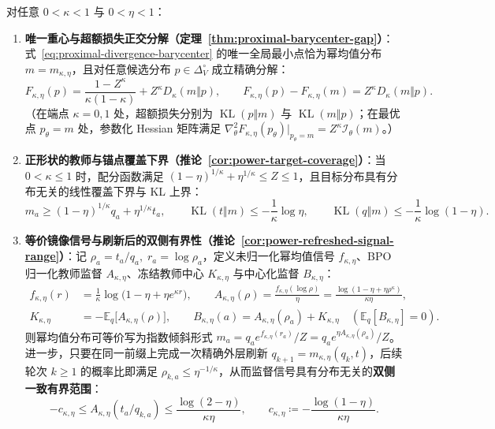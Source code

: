 \documentclass[lang=cn,scheme=chinese,openany]{../book/elegantbook}
\newcommand{\E}{\mathbb E}
\newcommand{\KL}{\operatorname{KL}}
\begin{document}
\begin{theorem}
\label{thm:proximal-barycenter-gap}
\label{cor:power-target-coverage}
\label{cor:power-refreshed-signal-range}
对任意 $0<\kappa<1$ 与 $0<\eta<1$：
\begin{enumerate}
\item \textbf{唯一重心与超额损失正交分解（定理~\ref{thm:proximal-barycenter-gap}）}：式~\eqref{eq:proximal-divergence-barycenter} 的唯一全局最小点恰为幂均值分布 $m=m_{\kappa,\eta}$，且对任意候选分布 $p\in\Delta_V^\circ$ 成立精确分解：
\begin{equation}
 F_{\kappa,\eta}(p)=\frac{1-Z^\kappa}{\kappa(1-\kappa)}+Z^\kappa D_\kappa(m\Vert p),\qquad
 F_{\kappa,\eta}(p)-F_{\kappa,\eta}(m)=Z^\kappa D_\kappa(m\Vert p).
 \label{eq:proximal-gap-identity}
\end{equation}
（在端点 $\kappa=0,1$ 处，超额损失分别为 $\KL(p\Vert m)$ 与 $\KL(m\Vert p)$；在最优点 $p_\theta=m$ 处，参数化 Hessian 矩阵满足 $\nabla_\theta^2 F_{\kappa,\eta}(p_\theta)\big|_{p_\theta=m}=Z^\kappa\mathcal I_\theta(m)$。）
\item \textbf{正形状的教师与锚点覆盖下界（推论~\ref{cor:power-target-coverage}）}：当 $0<\kappa\le 1$ 时，配分函数满足 $(1-\eta)^{1/\kappa}+\eta^{1/\kappa}\le Z\le 1$，且目标分布具有分布无关的线性覆盖下界与 KL 上界：
\begin{equation}
 m_a\ge(1-\eta)^{1/\kappa}q_a+\eta^{1/\kappa}t_a,\qquad
 \KL(t\Vert m)\le-\frac1\kappa\log\eta,\qquad
 \KL(q\Vert m)\le-\frac1\kappa\log(1-\eta).
\end{equation}
\item \textbf{等价镜像信号与刷新后的双侧有界性（推论~\ref{cor:power-refreshed-signal-range}）}：记 $\rho_a=t_a/q_a,\; r_a=\log\rho_a$，定义未归一化幂均值信号 $f_{\kappa,\eta}$、BPO 归一化教师监督 $A_{\kappa,\eta}$、冻结教师中心 $K_{\kappa,\eta}$ 与中心化监督 $B_{\kappa,\eta}$：
\begin{align}
 f_{\kappa,\eta}(r)&=\frac1\kappa\log\bigl(1-\eta+\eta e^{\kappa r}\bigr),\qquad
 A_{\kappa,\eta}(\rho)=\frac{f_{\kappa,\eta}(\log\rho)}{\eta}=\frac{\log(1-\eta+\eta\rho^\kappa)}{\kappa\eta},
 \label{eq:proximal-power-signal}\\
 K_{\kappa,\eta}&=-\E_q\bigl[A_{\kappa,\eta}(\rho)\bigr],\qquad
 B_{\kappa,\eta}(a)=A_{\kappa,\eta}(\rho_a)+K_{\kappa,\eta}\quad(\E_q[B_{\kappa,\eta}]=0).
 \label{eq:center-explicit-definition}
\end{align}
则幂均值分布可等价写为指数倾斜形式 $m_a=q_a e^{f_{\kappa,\eta}(r_a)}/Z=q_a e^{\eta A_{\kappa,\eta}(\rho_a)}/Z$。进一步，只要在同一前缀上完成一次精确外层刷新 $q_{k+1}=m_{\kappa,\eta}(q_k,t)$，后续轮次 $k\ge 1$ 的概率比即满足 $\rho_{k,a}\le\eta^{-1/\kappa}$，从而监督信号具有分布无关的\textbf{双侧一致有界范围}：
\begin{equation}
 -c_{\kappa,\eta}\le A_{\kappa,\eta}(t_a/q_{k,a})\le\frac{\log(2-\eta)}{\kappa\eta},\qquad
 c_{\kappa,\eta}\coloneqq-\frac{\log(1-\eta)}{\kappa\eta}.
\end{equation}
\end{enumerate}
\end{theorem}
\end{document}
